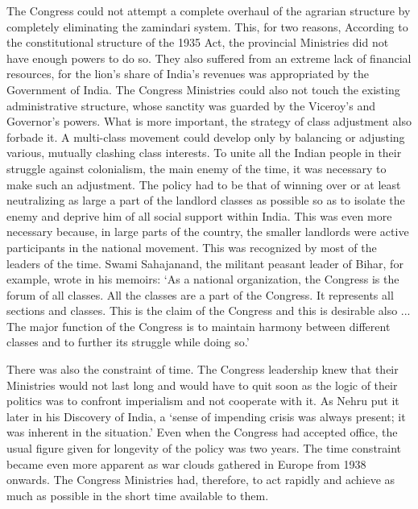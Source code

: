 \begin{multicols}{2}
The Congress could not attempt a complete overhaul of the agrarian structure by completely eliminating the zamindari system. This, for two reasons, According to the constitutional structure of the 1935 Act, the provincial Ministries did not have enough powers to do so. They also suffered from an extreme lack of financial resources, for the lion's share of India's revenues was appropriated by the Government of India. The Congress Ministries could also not touch the existing administrative structure, whose sanctity was guarded by the Viceroy's and Governor's powers. What is more important, the strategy of class adjustment also forbade it. A multi-class movement could develop only by balancing or adjusting various, mutually clashing class interests. To unite all the Indian people in their struggle against colonialism, the main enemy of the time, it was necessary to make such an adjustment. The policy had to be that of winning over or at least neutralizing as large a part of the landlord classes as possible so as to isolate the enemy and deprive him of all social support within India. This was even more necessary because, in large parts of the country, the smaller landlords were active participants in the national movement. This was recognized by most of the leaders of the time. Swami Sahajanand, the militant peasant leader of Bihar, for example, wrote in his memoirs: `As a national organization, the Congress is the forum of all classes. All the classes are a part of the Congress. It represents all sections and classes. This is the claim of the Congress and this is desirable also ... The major function of the Congress is to maintain harmony between different classes and to further its struggle while doing so.'

There was also the constraint of time. The Congress leadership knew that their Ministries would not last long and would have to quit soon as the logic of their politics was to confront imperialism and not cooperate with it. As Nehru put it later in his Discovery of India, a `sense of impending crisis was always present; it was inherent in the situation.' Even when the Congress had accepted office, the usual figure given for longevity of the policy was two years. The time constraint became even more apparent as war clouds gathered in Europe from 1938 onwards. The Congress Ministries had, therefore, to act rapidly and achieve as much as possible in the short time available to them.


\end{multicols}
